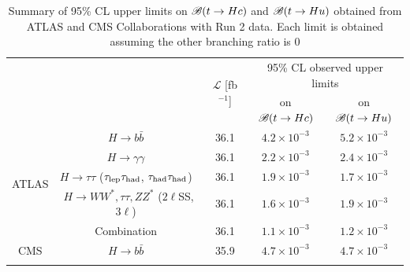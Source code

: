 \documentclass[PAPER, coverpage, atlasdraft=true, texlive=2016, UKenglish]{\ATLASLATEXPATH atlasdoc}
\providecommand{\DIFadd}[1]{{\protect\color{blue}\uwave{#1}}} %
\providecommand{\DIFaddFL}[1]{\DIFadd{#1}} %
\providecommand{\DIFaddbeginFL}{} %
\providecommand{\DIFaddendFL}{} %
\providecommand{\DIFdelbeginFL}{} %
\providecommand{\DIFdelendFL}{} %
\begin{document}
\begin{table}[t!]
\caption{\DIFdelbeginFL %
\DIFdelendFL \DIFaddbeginFL \small{Summary of 95\% CL upper limits on $\mathscr{B}(t \to Hc)$ and $\mathscr{B}(t \to Hu)$ obtained from ATLAS and CMS Collaborations with Run 2 data. Each limit is obtained assuming the other branching ratio is 0}\DIFaddendFL }
\begin{center}
\small 
\begin{tabular}{ccccc}
\toprule\toprule
& &\multirow{2}{*}{$\mathcal{L}$ [fb$^{-1}$]} & \multicolumn{2}{c}{95\% CL observed upper limits}  \\
& & 										    & \multicolumn{1}{c}{on $\mathscr{B}(t \to Hc)$}            & \multicolumn{1}{c}{on $\mathscr{B}(t \to Hu)$} \\
\midrule
\multirow{5}{*}{ATLAS}
& $H \to b\bar{b}$~\cite{fcnc36}                                          & 36.1         & $4.2 \times 10^{-3}$ & $5.2 \times 10^{-3}$ \\
& $H \to \gamma\gamma$~\cite{Aaboud:2017mfd}                              & 36.1         & $2.2 \times 10^{-3}$  & $2.4 \times 10^{-3}$  \\
& $H \to \tau\tau$ ($\tau_{\mathrm{lep}} \tau_{\mathrm{had}}$, $\tau_{\mathrm{had}} \tau_{\mathrm{had}}$)~\cite{fcnc36}                   & 36.1         & $1.9 \times 10^{-3}$  & $1.7 \times 10^{-3}$  \\ 
& $H \to WW^*, \tau\tau, ZZ^*$ ($2\ell$SS, $3\ell$)~\cite{Aaboud:2018pob} & 36.1         & $1.6 \times 10^{-3}$  & $1.9 \times 10^{-3}$\\ 
& Combination~\cite{fcnc36}                                               & 36.1         & $1.1 \times 10^{-3}$  & $1.2 \times 10^{-3}$  \\\midrule
\multirow{1}{*}{CMS} 
& $H \to b\bar{b}$~\cite{Sirunyan:2017uae}                                & 35.9         & $4.7 \times 10^{-3}$  & $4.7 \times 10^{-3}$  \\
\DIFaddbeginFL & \DIFaddFL{$H \to b\bar{b}$~\mbox{%
\cite{CMS:2021gfa}                                     }\hspace{0pt}%
}& \DIFaddFL{137          }& \DIFaddFL{$9.4 \times 10^{-4}$  }& \DIFaddFL{$7.9 \times 10^{-4}$  }\\
\DIFaddendFL %
% 
\bottomrule\bottomrule
\end{tabular}
\label{tab:limits_summary_ref}
\end{center}
\end{table}
\end{document}
